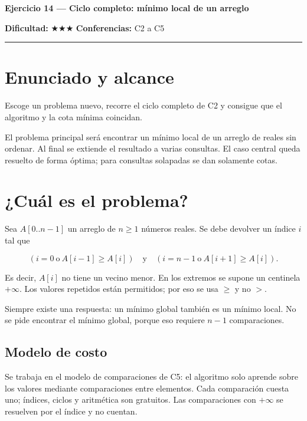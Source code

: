 \documentclass[11pt]{article}
\begin{document}
{\LARGE\bfseries\color{azultitulo} Ejercicio 14 --- Ciclo completo: mínimo local de un arreglo}

\vspace{2pt}
\textbf{Dificultad:} $\bigstar\bigstar\bigstar$ \quad \textbf{Conferencias:} C2 a C5
\vspace{8pt}
\hrule
\vspace{12pt}

\section*{Enunciado y alcance}

\begin{enunciado}
Escoge un problema nuevo, recorre el ciclo completo de C2 y consigue que el algoritmo y la cota mínima
coincidan.
\end{enunciado}

El problema principal será encontrar un mínimo local de un arreglo de reales sin ordenar. Al final se
extiende el resultado a varias consultas. El caso central queda resuelto de forma óptima; para consultas
solapadas se dan solamente cotas.

\section{¿Cuál es el problema?}

Sea $A[0..n-1]$ un arreglo de $n\ge 1$ números reales. Se debe devolver un índice $i$ tal que

\[
(i=0\ \text{o}\ A[i-1]\ge A[i])
\quad\text{y}\quad
(i=n-1\ \text{o}\ A[i+1]\ge A[i]).
\]

Es decir, $A[i]$ no tiene un vecino menor. En los extremos se supone un centinela $+\infty$. Los valores
repetidos están permitidos; por eso se usa $\ge$ y no $>$.

Siempre existe una respuesta: un mínimo global también es un mínimo local. No se pide encontrar el mínimo
global, porque eso requiere $n-1$ comparaciones.

\subsection*{Modelo de costo}

Se trabaja en el modelo de comparaciones de C5: el algoritmo solo aprende sobre los valores mediante
comparaciones entre elementos. Cada comparación cuesta uno; índices, ciclos y aritmética son gratuitos.
Las comparaciones con $+\infty$ se resuelven por el índice y no cuentan.
\end{document}
